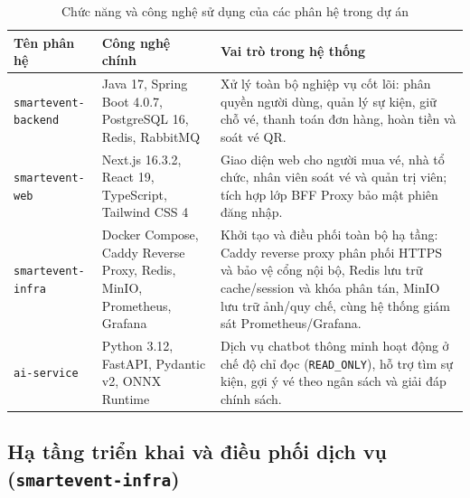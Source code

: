 \begin{table}[htbp]
\centering
\caption{Chức năng và công nghệ sử dụng của các phân hệ trong dự án}
\label{tab:four_repos_summary}
\small
\renewcommand{\arraystretch}{1.18}
\begin{tabularx}{\textwidth}{|L{3.6cm}|L{4.2cm}|X|}
\hline
{}
\textbf{Tên phân hệ} & \textbf{Công nghệ chính} & \textbf{Vai trò trong hệ thống} \\
\hline
\texttt{smartevent-\allowbreak backend} & Java 17, Spring Boot 4.0.7, PostgreSQL 16, Redis, RabbitMQ & Xử lý toàn bộ nghiệp vụ cốt lõi: phân quyền người dùng, quản lý sự kiện, giữ chỗ vé, thanh toán đơn hàng, hoàn tiền và soát vé QR. \\
\hline
\texttt{smartevent-web} & Next.js 16.3.2, React 19, TypeScript, Tailwind CSS 4 & Giao diện web cho người mua vé, nhà tổ chức, nhân viên soát vé và quản trị viên; tích hợp lớp BFF Proxy bảo mật phiên đăng nhập. \\
\hline
\texttt{smartevent-infra} & Docker Compose, Caddy Reverse Proxy, Redis, MinIO, Prometheus, Grafana & Khởi tạo và điều phối toàn bộ hạ tầng: Caddy reverse proxy phân phối HTTPS và bảo vệ cổng nội bộ, Redis lưu trữ cache/session và khóa phân tán, MinIO lưu trữ ảnh/quy chế, cùng hệ thống giám sát Prometheus/Grafana. \\
\hline
\texttt{ai-service} & Python 3.12, FastAPI, Pydantic v2, ONNX Runtime & Dịch vụ chatbot thông minh hoạt động ở chế độ chỉ đọc (\texttt{READ\_ONLY}), hỗ trợ tìm sự kiện, gợi ý vé theo ngân sách và giải đáp chính sách. \\
\hline
\end{tabularx}
\end{table}

\subsection{Hạ tầng triển khai và điều phối dịch vụ (\texttt{smartevent-infra})}

